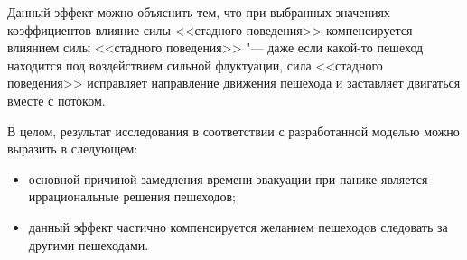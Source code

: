 Данный эффект можно объяснить тем, что при выбранных значениях коэффициентов влияние силы <<стадного поведения>> компенсируется
влиянием силы <<стадного поведения>> "--- даже если какой-то пешеход находится под воздействием сильной флуктуации,
сила <<стадного поведения>> исправляет направление движения пешехода и заставляет двигаться вместе с потоком.

В целом, результат исследования в соответствии с разработанной моделью можно выразить в следующем:

\begin{itemize}
  \item основной причиной замедления времени эвакуации при панике является иррациональные решения пешеходов;
  \item данный эффект частично компенсируется желанием пешеходов следовать за другими пешеходами.
\end{itemize}


